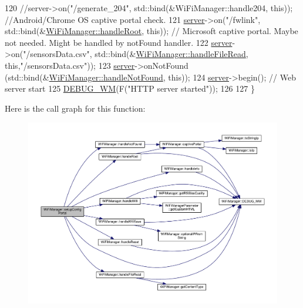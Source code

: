 \begin{DoxyCode}
120   \textcolor{comment}{//server->on("/generate\_204", std::bind(&WiFiManager::handle204, this));  //Android/Chrome OS captive
       portal check.}
121   \hyperlink{class_wi_fi_manager_a509523a01c0395cf0dc235b074f2a5ea}{server}->on(\textcolor{stringliteral}{"/fwlink"}, std::bind(&\hyperlink{class_wi_fi_manager_a47e4c7df7478f690c53ff9f5125c9760}{WiFiManager::handleRoot}, \textcolor{keyword}{this}));  \textcolor{comment}{//
      Microsoft captive portal. Maybe not needed. Might be handled by notFound handler.}
122   \hyperlink{class_wi_fi_manager_a509523a01c0395cf0dc235b074f2a5ea}{server}->on(\textcolor{stringliteral}{"/sensorsData.csv"}, std::bind(&\hyperlink{class_wi_fi_manager_a9e802fa4ca834a622f058a7176f47806}{WiFiManager::handleFileRead}, \textcolor{keyword}{
      this},\textcolor{stringliteral}{"/sensorsData.csv"}));
123   \hyperlink{class_wi_fi_manager_a509523a01c0395cf0dc235b074f2a5ea}{server}->onNotFound (std::bind(&\hyperlink{class_wi_fi_manager_a7d01f7de3e4b76acdabffac79fa3d0ab}{WiFiManager::handleNotFound}, \textcolor{keyword}{this}));
124   \hyperlink{class_wi_fi_manager_a509523a01c0395cf0dc235b074f2a5ea}{server}->begin(); \textcolor{comment}{// Web server start}
125   \hyperlink{class_wi_fi_manager_ae5f595c670ccbcf9a191baf50f5c7c26}{DEBUG\_WM}(F(\textcolor{stringliteral}{"HTTP server started"}));
126 
127 \}
\end{DoxyCode}
Here is the call graph for this function\+:\nopagebreak
\begin{figure}[H]
\begin{center}
\leavevmode
\includegraphics[width=350pt]{d4/dc8/class_wi_fi_manager_a1743325d0dd86d011df96b22d2a0ddd6_cgraph}
\end{center}
\end{figure}
